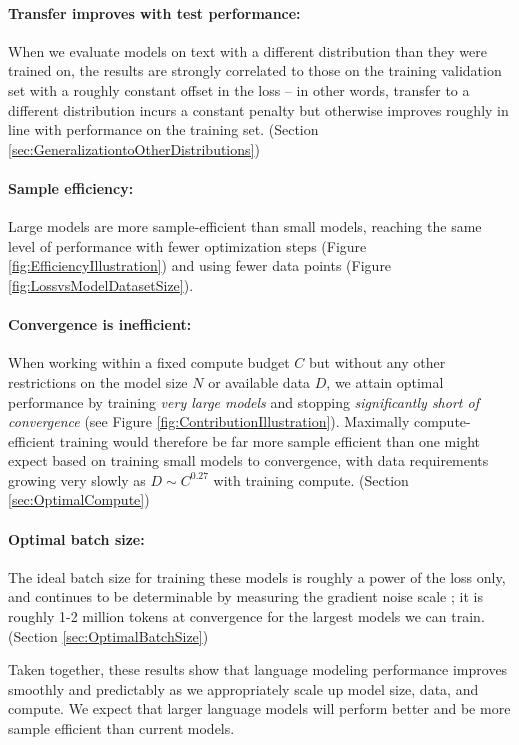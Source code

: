 \paragraph{Transfer improves with test performance:} When we evaluate models on text with a different distribution than they were trained on, the results are strongly correlated to those on the training validation set with a roughly constant offset in the loss -- in other words, transfer to a different distribution incurs a constant penalty but otherwise improves roughly in line with performance on the training set. (Section \ref{sec:GeneralizationtoOtherDistributions})

\paragraph{Sample efficiency:} Large models are  more sample-efficient than small models, reaching the same level of performance with fewer optimization steps (Figure \ref{fig:EfficiencyIllustration}) and using  fewer data points (Figure \ref{fig:LossvsModelDatasetSize}).

\paragraph{Convergence is inefficient:} When working within a fixed compute budget $C$ but without any other restrictions on the model size $N$ or available data $D$, we attain optimal performance by training \emph{very large models} and stopping \emph{significantly short of convergence} (see Figure \ref{fig:ContributionIllustration}).  Maximally compute-efficient training would therefore be far more sample efficient than one might expect based on training small models to convergence, with data requirements growing very slowly as $D \sim C^{0.27}$ with training compute. (Section \ref{sec:OptimalCompute})

\paragraph{Optimal batch size:} The ideal batch size for training these models is roughly a power of the loss only, and continues to be determinable by measuring the gradient noise scale \cite{1812.06162}; it is roughly 1-2 million tokens at convergence for the largest models we can train. (Section \ref{sec:OptimalBatchSize})

Taken together, these results show that language modeling performance improves smoothly and predictably as we appropriately scale up model size, data, and compute.  We expect that larger language models will perform better and be more sample efficient than current models.

